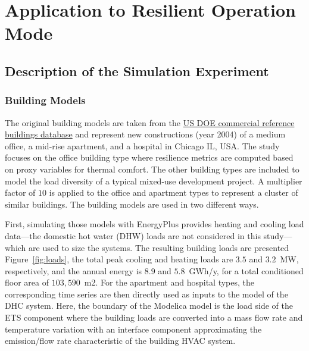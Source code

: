 \section{Application to Resilient Operation Mode} \label{sec:application}

\subsection{Description of the Simulation Experiment} \label{sec:experiment}

\subsubsection{Building Models} \label{sec:buildings}

The original building models are taken from the \href{https://www.energy.gov/eere/buildings/commercial-reference-buildings}{US DOE commercial reference buildings database} and represent new constructions (year 2004) of a medium office, a mid-rise apartment, and a hospital in Chicago IL, USA.
The study focuses on the office building type where resilience metrics are computed based on proxy variables for thermal comfort. The other building types are included to model the load diversity of a typical mixed-use development project.
A multiplier factor of $10$ is applied to the office and apartment types to represent a cluster of similar buildings.
The building models are used in two different ways.

First, simulating those models with EnergyPlus provides heating and cooling load data---the domestic hot water (DHW) loads are not considered in this study---which are used to size the systems.
The resulting building loads are presented Figure~\ref{fig:loads}, the total peak cooling and heating loads are $3.5$ and $3.2$~MW, respectively, and the annual energy is $8.9$ and $5.8$~GWh/y, for a total conditioned floor area of $103,590$~m2.
For the apartment and hospital types, the corresponding time series are then directly used as inputs to the model of the DHC system.
Here, the boundary of the Modelica model is the load side of the ETS component where the building loads are converted into a mass flow rate and temperature variation with an interface component approximating the emission/flow rate characteristic of the building HVAC system.

